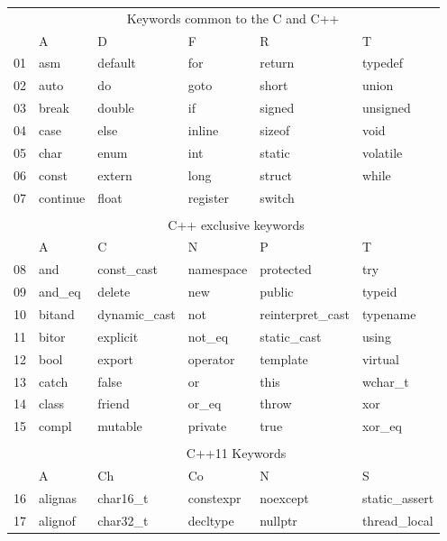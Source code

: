 


\begin{table}[!h]
\centering
\begin{tabular}{|l|l|l|l|l|l|} 
\hhline{~-----|}
\multicolumn{1}{l|}{} & \multicolumn{5}{c|}{{\cellcolor[rgb]{1,0.741,0.267}}Keywords common to the C and C++~} \\ 
\cline{2-6}
\multicolumn{1}{l|}{} & A & D & F & R & T \\ 
\hline
01 & asm & default & for & return & typedef \\
\rowcolor[rgb]{0.753,0.753,0.753} 02 & auto & do & goto & short & union \\
03 & break & double & if & signed & unsigned \\
\rowcolor[rgb]{0.753,0.753,0.753} 04 & case & else & inline & sizeof & void \\
05 & char & enum & int & static & volatile \\
\rowcolor[rgb]{0.753,0.753,0.753} 06 & const & extern & long & struct & while \\
07 & continue & float & register & switch &  \\ 
\hline
\multicolumn{1}{l}{} & \multicolumn{1}{l}{} & \multicolumn{1}{l}{} & \multicolumn{1}{l}{} & \multicolumn{1}{l}{} & \multicolumn{1}{l}{} \\ 
\hhline{~-----|}
\multicolumn{1}{l|}{} & \multicolumn{5}{c|}{{\cellcolor[rgb]{1,0.741,0.267}}C++ exclusive keywords    } \\ 
\cline{2-6}
\multicolumn{1}{l|}{} & A & C & N & P & T \\ 
\hline
\rowcolor[rgb]{0.753,0.753,0.753} 08 & and & const\_cast & namespace & protected & try \\
09 & and\_eq & delete & new & public & typeid \\
\rowcolor[rgb]{0.753,0.753,0.753} 10 & bitand & dynamic\_cast & not & reinterpret\_cast & typename \\
11 & bitor & explicit & not\_eq & static\_cast & using \\
\rowcolor[rgb]{0.753,0.753,0.753} 12 & bool & export & operator & template & virtual \\
13 & catch & false & or & this & wchar\_t \\
\rowcolor[rgb]{0.753,0.753,0.753} 14 & class & friend & or\_eq & throw & xor \\
15 & compl & mutable & private & true & xor\_eq \\ 
\hline
\multicolumn{1}{l}{} & \multicolumn{1}{l}{} & \multicolumn{1}{l}{} & \multicolumn{1}{l}{} & \multicolumn{1}{l}{} & \multicolumn{1}{l}{} \\ 
\hhline{~-----|}
\multicolumn{1}{l|}{} & \multicolumn{5}{c|}{{\cellcolor[rgb]{1,0.741,0.267}}C++11 Keywords    } \\ 
\cline{2-6}
\multicolumn{1}{l|}{} & A & Ch & Co & N & S \\ 
\hline
\rowcolor[rgb]{0.753,0.753,0.753} 16 & alignas & char16\_t & constexpr & noexcept & static\_assert \\
17 & alignof & char32\_t & decltype & nullptr & thread\_local \\
\hline
\end{tabular}
\end{table}